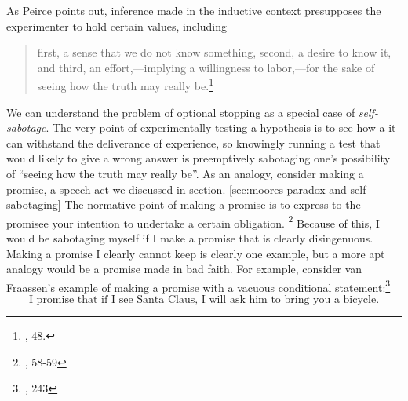 


As Peirce points out, inference made in the inductive context presupposes the experimenter to hold certain values, including

\begin{quote}
first, a sense that we do not know something, second, a desire to know
it, and third, an effort,---implying a willingness to labor,---for the
sake of seeing how the truth may really be.\footnote{\cite{essentialpeirce2}, 48.}
\end{quote}
We can understand the problem of optional stopping as a special
case of \emph{self-sabotage}. The very point of experimentally testing a hypothesis is to see how a it can withstand the deliverance of experience, so knowingly running a test that would likely to give a wrong answer is preemptively sabotaging one's possibility of ``seeing how the truth may really be''. As an analogy, consider making a promise, a speech act we discussed in section. \ref{sec:moores-paradox-and-self-sabotaging} The normative point of making a promise is to express to the promisee your intention to undertake a certain obligation. \footnote{\cite{searle}, 58-59} Because of this, I would be sabotaging myself if I make a promise that is clearly disingenuous. Making a promise I clearly cannot keep is clearly one example, but a more apt analogy would be a promise made in bad faith. For example, consider van Fraassen's example of making a promise with a vacuous conditional statement:\footnote{\cite{empiricalstance}, 243}
\begin{equation}
\text{I promise that if I see Santa Claus, I will ask him to bring you a bicycle.}	
\end{equation}

